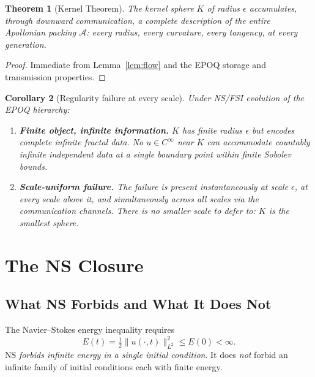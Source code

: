 \documentclass[11pt]{article}
\theoremstyle{plain}
\newtheorem{theorem}{Theorem}
\newtheorem{corollary}[theorem]{Corollary}
\theoremstyle{definition}
\theoremstyle{remark}
\begin{document}
\begin{theorem}[Kernel Theorem]
\label{thm:kernel}
The kernel sphere $K$ of radius $\epsilon$ accumulates, through downward
communication, a complete description of the entire Apollonian packing
$\mathcal{A}$: every radius, every curvature, every tangency, at every
generation.
\end{theorem}

\begin{proof}
Immediate from Lemma~\ref{lem:flow} and the EPOQ storage and transmission
properties.
\end{proof}

\begin{corollary}[Regularity failure at every scale]
\label{cor:every_scale}
Under NS/FSI evolution of the EPOQ hierarchy:
\begin{enumerate}
  \item[(i)] \textbf{Finite object, infinite information.} $K$ has finite
  radius $\epsilon$ but encodes complete infinite fractal data. No $u \in
  C^\infty$ near $K$ can accommodate countably infinite independent data
  at a single boundary point within finite Sobolev bounds.

  \item[(ii)] \textbf{Scale-uniform failure.} The failure is present
  instantaneously at scale $\epsilon$, at every scale above it, and
  simultaneously across all scales via the communication channels. There is
  no smaller scale to defer to: $K$ is the smallest sphere.
\end{enumerate}
\end{corollary}

\section{The NS Closure}
\label{sec:closure}

\subsection{What NS Forbids and What It Does Not}

The Navier--Stokes energy inequality requires
\[
  E(t) = \tfrac{1}{2}\|u(\cdot,t)\|_{L^2}^2 \leq E(0) < \infty.
\]
NS \emph{forbids infinite energy in a single initial condition}. It does
\emph{not} forbid an infinite family of initial conditions each with finite
energy.
\end{document}
